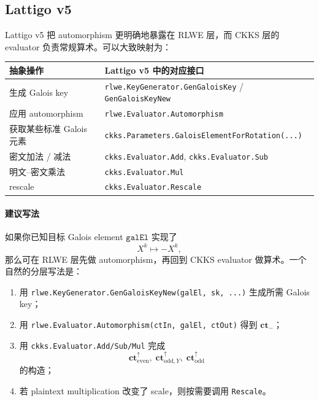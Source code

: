 \documentclass[11pt,a4paper]{ctexart}
\newcommand{\ctm}{\mathbf{ct}_{-}}
\newcommand{\cte}{\mathbf{ct}_{\mathrm{even}}^{\uparrow}}
\newcommand{\ctoy}{\mathbf{ct}_{\mathrm{odd},Y}^{\uparrow}}
\newcommand{\cto}{\mathbf{ct}_{\mathrm{odd}}^{\uparrow}}
\begin{document}
\subsection{Lattigo v5}

Lattigo v5 把 automorphism 更明确地暴露在 RLWE 层，而 CKKS 层的 evaluator 负责常规算术。可以大致映射为：

\begin{center}
\begin{tabular}{>{\raggedright\arraybackslash}p{} >{\raggedright\arraybackslash}p{}}
\toprule
抽象操作 & Lattigo v5 中的对应接口 \\ \midrule
生成 Galois key &
\texttt{rlwe.KeyGenerator.GenGaloisKey} / \texttt{GenGaloisKeyNew} \\[4pt]
应用 automorphism &
\texttt{rlwe.Evaluator.Automorphism} \\[4pt]
获取某些标准 Galois 元素 &
\texttt{ckks.Parameters.GaloisElementForRotation(...)} \\[4pt]
密文加法 / 减法 &
\texttt{ckks.Evaluator.Add}, \texttt{ckks.Evaluator.Sub} \\[4pt]
明文--密文乘法 &
\texttt{ckks.Evaluator.Mul} \\[4pt]
rescale &
\texttt{ckks.Evaluator.Rescale} \\[4pt]
\bottomrule
\end{tabular}
\end{center}

\paragraph{建议写法}
如果你已知目标 Galois element \(\texttt{galEl}\) 实现了
\[
X^k\mapsto -X^k,
\]
那么可在 RLWE 层先做 automorphism，再回到 CKKS evaluator 做算术。一个自然的分层写法是：

\begin{enumerate}[label=(\arabic*)]
    \item 用 \texttt{rlwe.KeyGenerator.GenGaloisKeyNew(galEl, sk, ...)} 生成所需 Galois key；
    \item 用 \texttt{rlwe.Evaluator.Automorphism(ctIn, galEl, ctOut)} 得到 \(\ctm\)；
    \item 用 \texttt{ckks.Evaluator.Add/Sub/Mul} 完成
    \[
    \cte,\;\ctoy,\;\cto
    \]
    的构造；
    \item 若 plaintext multiplication 改变了 scale，则按需要调用 \texttt{Rescale}。
\end{enumerate}
\end{document}
